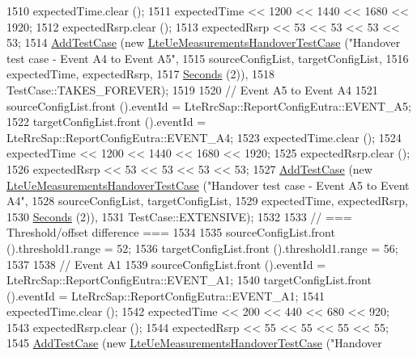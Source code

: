 \begin{DoxyCode}
1510   expectedTime.clear ();
1511   expectedTime << 1200 << 1440 << 1680 << 1920;
1512   expectedRsrp.clear ();
1513   expectedRsrp << 53 << 53 << 53 << 53;
1514   \hyperlink{classns3_1_1TestCase_a3718088e3eefd5d6454569d2e0ddd835}{AddTestCase} (\textcolor{keyword}{new} \hyperlink{classLteUeMeasurementsHandoverTestCase}{LteUeMeasurementsHandoverTestCase} (\textcolor{stringliteral}{"Handover
       test case - Event A4 to Event A5"},
1515                                                       sourceConfigList, targetConfigList,
1516                                                       expectedTime, expectedRsrp,
1517                                                       \hyperlink{group__timecivil_ga33c34b816f8ff6628e33d5c8e9713b9e}{Seconds} (2)),
1518                TestCase::TAKES\_FOREVER);
1519 
1520   \textcolor{comment}{// Event A5 to Event A4}
1521   sourceConfigList.front ().eventId = LteRrcSap::ReportConfigEutra::EVENT\_A5;
1522   targetConfigList.front ().eventId = LteRrcSap::ReportConfigEutra::EVENT\_A4;
1523   expectedTime.clear ();
1524   expectedTime << 1200 << 1440 << 1680 << 1920;
1525   expectedRsrp.clear ();
1526   expectedRsrp << 53 << 53 << 53 << 53;
1527   \hyperlink{classns3_1_1TestCase_a3718088e3eefd5d6454569d2e0ddd835}{AddTestCase} (\textcolor{keyword}{new} \hyperlink{classLteUeMeasurementsHandoverTestCase}{LteUeMeasurementsHandoverTestCase} (\textcolor{stringliteral}{"Handover
       test case - Event A5 to Event A4"},
1528                                                       sourceConfigList, targetConfigList,
1529                                                       expectedTime, expectedRsrp,
1530                                                       \hyperlink{group__timecivil_ga33c34b816f8ff6628e33d5c8e9713b9e}{Seconds} (2)),
1531                TestCase::EXTENSIVE);
1532 
1533   \textcolor{comment}{// === Threshold/offset difference ===}
1534 
1535   sourceConfigList.front ().threshold1.range = 52;
1536   targetConfigList.front ().threshold1.range = 56;
1537 
1538   \textcolor{comment}{// Event A1}
1539   sourceConfigList.front ().eventId = LteRrcSap::ReportConfigEutra::EVENT\_A1;
1540   targetConfigList.front ().eventId = LteRrcSap::ReportConfigEutra::EVENT\_A1;
1541   expectedTime.clear ();
1542   expectedTime << 200 << 440 << 680 << 920;
1543   expectedRsrp.clear ();
1544   expectedRsrp << 55 << 55 << 55 << 55;
1545   \hyperlink{classns3_1_1TestCase_a3718088e3eefd5d6454569d2e0ddd835}{AddTestCase} (\textcolor{keyword}{new} \hyperlink{classLteUeMeasurementsHandoverTestCase}{LteUeMeasurementsHandoverTestCase} (\textcolor{stringliteral}{"Handover
}
\end{DoxyCode}
